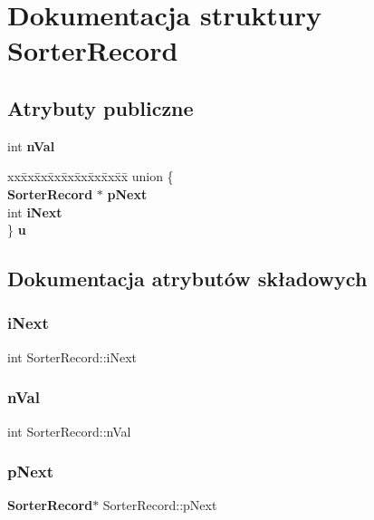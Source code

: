 \section{Dokumentacja struktury Sorter\+Record}
\label{struct_sorter_record}
\subsection*{Atrybuty publiczne}
\begin{DoxyCompactItemize}
\item 
int \textbf{ n\+Val}
\item 
\begin{tabbing}
xx\=xx\=xx\=xx\=xx\=xx\=xx\=xx\=xx\=\kill
union \{\\
\>\textbf{ SorterRecord} $\ast$ \textbf{ pNext}\\
\>int \textbf{ iNext}\\
\} \textbf{ u}\\

\end{tabbing}\end{DoxyCompactItemize}


\subsection{Dokumentacja atrybutów składowych}
\mbox{\label{struct_sorter_record_ad6137a98222e993fc2ff36dded56cce8}} 
\subsubsection{iNext}
{\footnotesize\ttfamily int Sorter\+Record\+::i\+Next}

\mbox{\label{struct_sorter_record_a2b8ffc0f8410826de8b41425759bf462}} 
\subsubsection{nVal}
{\footnotesize\ttfamily int Sorter\+Record\+::n\+Val}

\mbox{\label{struct_sorter_record_a08fdaa8302834166f6a8d12e09c95b58}} 
\subsubsection{pNext}
{\footnotesize\ttfamily \textbf{ Sorter\+Record}$\ast$ Sorter\+Record\+::p\+Next}


